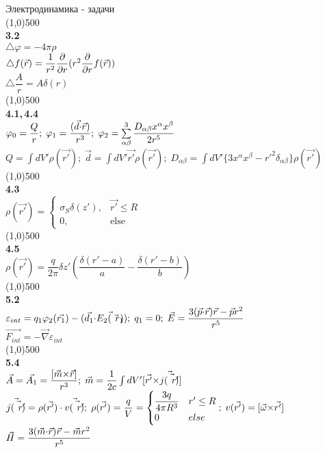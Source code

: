 

\newcommand{\num}[1]{\line(1,0){500}\\\textbf{#1}\\}
\fancyhf{}
\cfoot{\thepage}


Электродинамика - задачи\\

\num{3.2}
$\triangle \varphi = -4\pi \rho$\\
$\triangle f(\vec{r}) = \dfrac1{r^2} \dfrac{\partial }{\partial r} (r^2 \dfrac{\partial }{\partial r}f(\vec{r})) $\\
$\triangle \dfrac{A}{r} = A \delta(r) $\\

\num{4.1,\,4.4}
$\varphi_0 = \dfrac{Q}{r};\; \varphi_1 = \dfrac{(\vec{d}{\cdot}\vec{r})}{r^3};\;\varphi_2 = \sum\limits_{\alpha\beta}^3 \dfrac{D_{\alpha\beta}x^\alpha x^\beta}{2r^5}$\\
$Q = \int dV' \rho(\vec{r'});\;\vec{d}=\int dV' \vec{r'}\rho(\vec{r'});\; D_{\alpha\beta} = \int dV' \{3x^\alpha x^\beta - r'^2 \delta_{\alpha\beta}\}\rho(\vec{r'})  $\\

\num{4.3}
$\rho(\vec{r'}) =
\begin{cases}
    \sigma_S\delta(z'), & \vec{r'} \le R \\
    0, & \text{else}
\end{cases}$\\

\num{4.5}
$\rho(\vec{r'}) = \dfrac{q}{2\pi}\delta{z'}\left(\dfrac{\delta(r'-a)}{a}-\dfrac{\delta(r'-b)}{b} \right)$\\

\num{5.2}
$\varepsilon_{int} = q_1 \varphi_2(\vec{r_1}) - (\vec{d_1}{\cdot}\vec{E_2(\vec{r_1})});\;q_1 = 0;\; \vec{E} = \dfrac{3(\vec{p}{\cdot}\vec{r})\vec{r}-\vec{p}r^2}{r^5}$\\
$\vec{F_{int}} = -\vec{\nabla}\varepsilon_{int}$\\

\num{5.4}
$\vec{A} = \vec{A_1} = \dfrac{[\vec{m}{\times}\vec{r}]}{r^3};\;\vec{m} = \dfrac1{2c}\int dV' [\vec{r'}{\times}\vec{j(\vec{r'})}] $\\
$ \vec{j(\vec{r'})} = \rho(\vec{r'}) \cdot \vec{v(\vec{r'})};\; \rho(\vec{r'}) = \dfrac{q}{V} = \begin{cases}\dfrac{3q}{4\pi R^3} & r'\le R \\ 0 & else \end{cases};\; v(\vec{r'}) = [\vec{\omega}{\times}\vec{r'}]$\\
$\vec{H} = \dfrac{3(\vec{m}{\cdot}\vec{r})\vec{r}-\vec{m}r^2}{r^5}$\\

